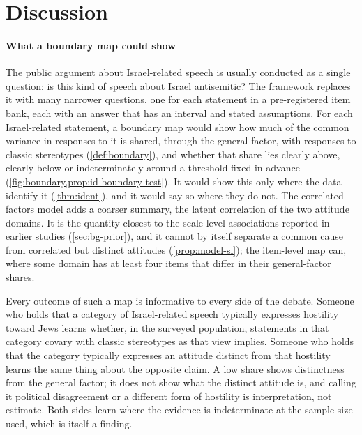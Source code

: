 \section{Discussion}\label{sec:discussion}

\paragraph{What a boundary map could show}
The public argument about Israel-related speech is usually conducted as a
single question: is this kind of speech about Israel antisemitic? The framework
replaces it with many narrower questions, one for each statement in a
pre-registered item bank, each with an answer that has an interval and
stated assumptions. For each Israel-related statement, a boundary map would
show how much of the common variance in responses to it is shared, through
the general factor, with responses to classic stereotypes
(\cref{def:boundary}), and whether that share lies clearly above, clearly
below or indeterminately around a threshold fixed in advance
(\cref{fig:boundary,prop:id-boundary-test}). It would show this only where the data identify it
(\cref{thm:ident}), and it would say so where they do not. The
correlated-factors model adds a coarser summary, the latent correlation of
the two attitude domains. It is the quantity closest to the scale-level
associations reported in earlier studies (\cref{sec:bg-prior}), and it
cannot by itself separate a common cause from correlated but distinct
attitudes (\cref{prop:model-sl}); the item-level map can, where some domain
has at least four items that differ in their general-factor shares.

Every outcome of such a map is informative to every side of the debate.
Someone who holds that a category of Israel-related speech typically
expresses hostility toward Jews learns whether, in the surveyed population,
statements in that category covary with classic stereotypes as that view
implies. Someone who holds that the category typically expresses an
attitude distinct from that hostility learns the same thing about the
opposite claim. A low share shows distinctness from the general factor; it
does not show what the distinct attitude is, and calling it political
disagreement or a different form of hostility is interpretation, not
estimate. Both sides learn where the evidence is indeterminate at the sample
size used, which is itself a finding.

